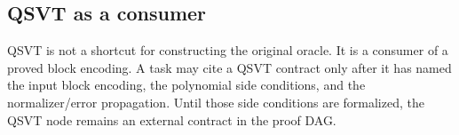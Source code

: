 \subsection{QSVT as a consumer}

QSVT is not a shortcut for constructing the original oracle.  It is a consumer
of a proved block encoding.  A task may cite a QSVT contract only after it has
named the input block encoding, the polynomial side conditions, and the
normalizer/error propagation.  Until those side conditions are formalized, the
QSVT node remains an external contract in the proof DAG.
